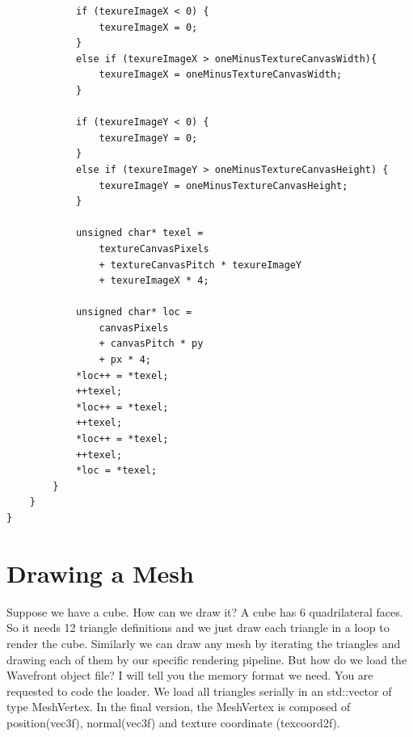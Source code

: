 \begin{lstlisting}
			if (texureImageX < 0) {
				texureImageX = 0;
			}
			else if (texureImageX > oneMinusTextureCanvasWidth){
				texureImageX = oneMinusTextureCanvasWidth;
			}

			if (texureImageY < 0) {
				texureImageY = 0;
			}
			else if (texureImageY > oneMinusTextureCanvasHeight) {
				texureImageY = oneMinusTextureCanvasHeight;
			}

			unsigned char* texel =
				textureCanvasPixels
				+ textureCanvasPitch * texureImageY
				+ texureImageX * 4;
							
			unsigned char* loc =
				canvasPixels
				+ canvasPitch * py
				+ px * 4;
			*loc++ = *texel;
			++texel;
			*loc++ = *texel;
			++texel;
			*loc++ = *texel;
			++texel;
			*loc = *texel;
		}
	}
}
\end{lstlisting}
\section{Drawing a Mesh}
Suppose we have a cube. How can we draw it? A cube has 6 quadrilateral faces. So it needs 12 triangle definitions and we just draw each triangle in a loop to render the cube. Similarly we can draw any mesh by iterating the triangles and drawing each of them by our specific rendering pipeline. But how do we load the Wavefront object file? I will tell you the memory format we need. You are requested to code the loader. We load all triangles serially in an std::vector of type  MeshVertex. In the final version, the MeshVertex is composed of position(vec3f), normal(vec3f) and texture coordinate (texcoord2f).

\clearpage